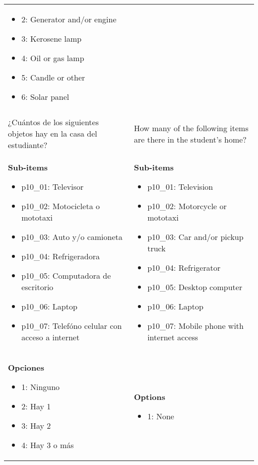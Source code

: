 \documentclass[11pt]{article}
\begin{document}
\begin{longtable}{@{}LL@{}}
\begin{itemize}[leftmargin=*]
\item 2: Generator and/or engine
\item 3: Kerosene lamp
\item 4: Oil or gas lamp
\item 5: Candle or other
\item 6: Solar panel\end{itemize} \\
\addlinespace[4pt]
 \\ 
¿Cuántos de los siguientes objetos hay en la casa del estudiante? & How many of the following items are there in the student's home? \\
\textbf{Sub-items}\par\begin{itemize}[leftmargin=*]\item p10\_01: Televisor
\item p10\_02: Motocicleta o mototaxi
\item p10\_03: Auto y/o camioneta
\item p10\_04: Refrigeradora
\item p10\_05: Computadora de escritorio
\item p10\_06: Laptop
\item p10\_07: Telefóno celular con acceso a internet\end{itemize} & \textbf{Sub-items}\par\begin{itemize}[leftmargin=*]\item p10\_01: Television
\item p10\_02: Motorcycle or mototaxi
\item p10\_03: Car and/or pickup truck
\item p10\_04: Refrigerator
\item p10\_05: Desktop computer
\item p10\_06: Laptop
\item p10\_07: Mobile phone with internet access\end{itemize} \\
\textbf{Opciones}\par\begin{itemize}[leftmargin=*]\item 1: Ninguno
\item 2: Hay 1
\item 3: Hay 2
\item 4: Hay 3 o más\end{itemize} & \textbf{Options}\par\begin{itemize}[leftmargin=*]\item 1: None

\end{itemize}
\end{longtable}
\end{document}
